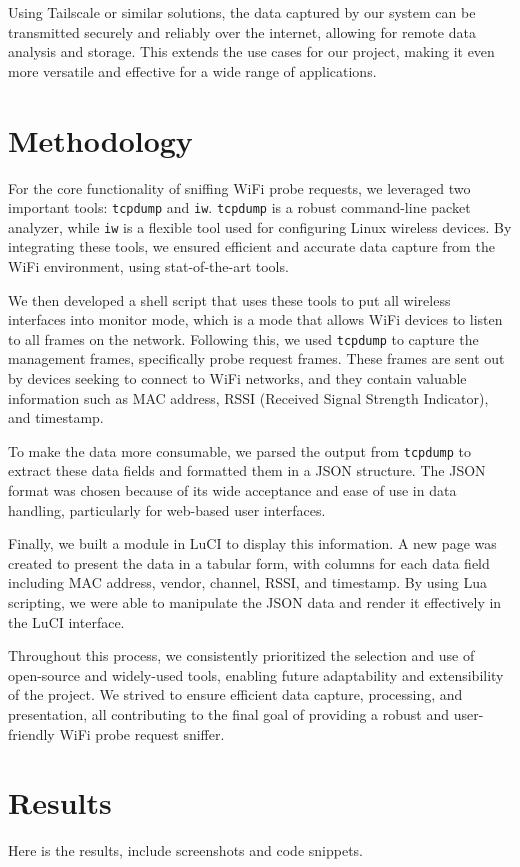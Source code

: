 \documentclass{article}
\begin{document}
Using Tailscale or similar solutions, the data captured by our system can be transmitted securely and reliably over the internet, allowing for remote data analysis and storage. This extends the use cases for our project, making it even more versatile and effective for a wide range of applications.

\section{Methodology}

For the core functionality of sniffing WiFi probe requests, we leveraged two important tools: \texttt{tcpdump} and \texttt{iw}. \texttt{tcpdump} is a robust command-line packet analyzer, while \texttt{iw} is a flexible tool used for configuring Linux wireless devices. By integrating these tools, we ensured efficient and accurate data capture from the WiFi environment, using stat-of-the-art tools.

We then developed a shell script that uses these tools to put all wireless interfaces into monitor mode, which is a mode that allows WiFi devices to listen to all frames on the network. Following this, we used \texttt{tcpdump} to capture the management frames, specifically probe request frames. These frames are sent out by devices seeking to connect to WiFi networks, and they contain valuable information such as MAC address, RSSI (Received Signal Strength Indicator), and timestamp. 

To make the data more consumable, we parsed the output from \texttt{tcpdump} to extract these data fields and formatted them in a JSON structure. The JSON format was chosen because of its wide acceptance and ease of use in data handling, particularly for web-based user interfaces. 

Finally, we built a module in LuCI to display this information. A new page was created to present the data in a tabular form, with columns for each data field including MAC address, vendor, channel, RSSI, and timestamp. By using Lua scripting, we were able to manipulate the JSON data and render it effectively in the LuCI interface. 

Throughout this process, we consistently prioritized the selection and use of open-source and widely-used tools, enabling future adaptability and extensibility of the project. We strived to ensure efficient data capture, processing, and presentation, all contributing to the final goal of providing a robust and user-friendly WiFi probe request sniffer.


\section{Results}
 
Here is the results, include screenshots and code snippets.


\end{document}

